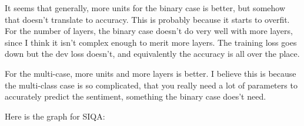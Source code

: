 \documentclass[12pt]{article}
\theoremstyle{definitionstyle}
\begin{document}
\begin{enumerate}
        It seems that generally, more units for the binary case is better, but somehow that doesn't translate to accuracy. This is probably because it starts to overfit. For the number of layers, the binary case doesn't do very well with more layers, since I think it isn't complex enough to merit more layers. The training loss goes down but the dev loss doesn't, and equivalently the accuracy is all over the place.

        For the multi-case, more units and more layers is better. I believe this is because the multi-class case is so complicated, that you really need a lot of parameters to accurately predict the sentiment, something the binary case does't need. 

        Here is the graph for SIQA:
        \begin{figure}[h!]
            \centering
        

\end{figure}
\end{enumerate}
\end{document}
